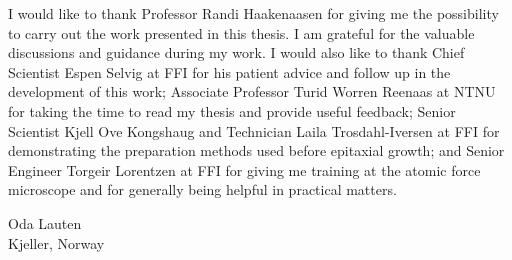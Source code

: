 %
I would like to thank Professor Randi Haakenaasen for giving me the possibility to carry out the work presented in this thesis. I am grateful for the valuable discussions and guidance during my work. I would also like to thank Chief Scientist Espen Selvig at FFI for his patient advice and follow up in the development of this work; Associate Professor Turid Worren Reenaas at NTNU for taking the time to read my thesis and provide useful feedback; Senior Scientist Kjell Ove Kongshaug and Technician Laila Trosdahl-Iversen at FFI for demonstrating the preparation methods used before epitaxial growth; and Senior Engineer Torgeir Lorentzen at FFI for giving me training at the atomic force microscope and for generally being helpful in practical matters.
%
\vspace{1.0cm}
\begin{flushright}
    Oda Lauten      \\
    Kjeller, Norway \\
    \month~\year    \\
\end{flushright}
